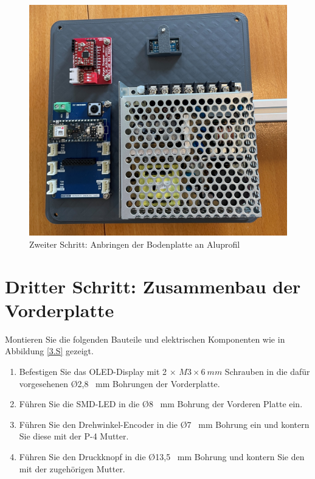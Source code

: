\begin{figure}[H]
	\begin{center}
		\includegraphics[width=\textwidth]{Images/2Schr.jpg}
		\caption{Zweiter Schritt: Anbringen der Bodenplatte an Aluprofil} \label{2.S}
	\end{center}
\end{figure}


\section{Dritter Schritt: Zusammenbau der Vorderplatte}
Montieren Sie die folgenden Bauteile und elektrischen Komponenten wie in Abbildung \ref{3.S} gezeigt.

\begin{enumerate}
	\item Befestigen Sie das OLED-Display mit 2 $\times$ $ M3 \times 6 \ mm $ Schrauben in die dafür vorgesehenen \O 2,8 \ mm Bohrungen der Vorderplatte.
	\item Führen Sie die SMD-LED in die \O 8 \ mm Bohrung der Vorderen Platte ein.
	\item Führen Sie den Drehwinkel-Encoder in die \O 7 \ mm Bohrung ein und kontern Sie diese mit der P-4 Mutter.
	\item Führen Sie den Druckknopf in die \O 13,5 \ mm Bohrung und kontern Sie den mit der zugehörigen Mutter.
\end{enumerate}

